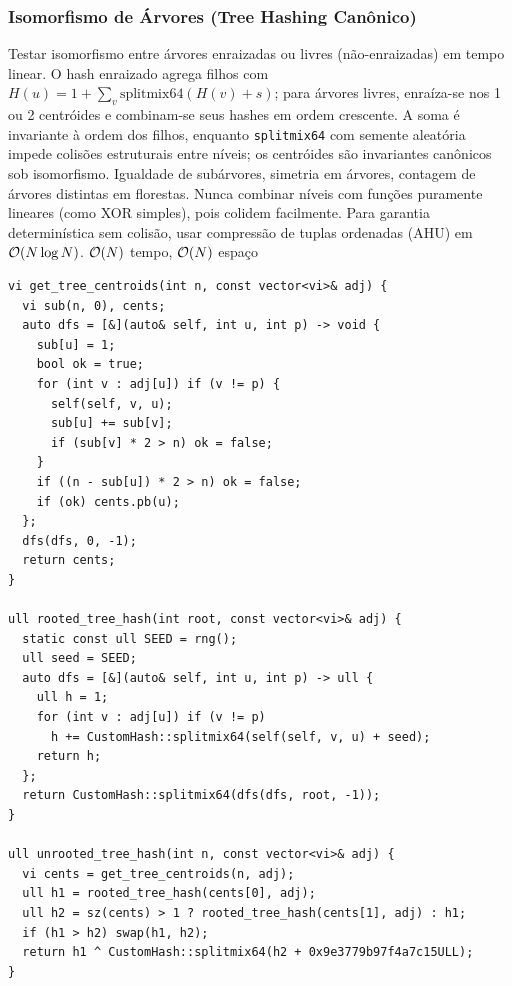 \subsubsection{Isomorfismo de Árvores (Tree Hashing Canônico)}
\algobox
  {Testar isomorfismo entre árvores enraizadas ou livres (não-enraizadas) em tempo linear.}
  {O hash enraizado agrega filhos com $H(u) = 1 + \sum_v \text{splitmix64}(H(v) + s)$; para árvores livres, enraíza-se nos 1 ou 2 centróides e combinam-se seus hashes em ordem crescente.}
  {A soma é invariante à ordem dos filhos, enquanto \texttt{splitmix64} com semente aleatória impede colisões estruturais entre níveis; os centróides são invariantes canônicos sob isomorfismo.}
  {Igualdade de subárvores, simetria em árvores, contagem de árvores distintas em florestas.}
  {Nunca combinar níveis com funções puramente lineares (como XOR simples), pois colidem facilmente. Para garantia determinística sem colisão, usar compressão de tuplas ordenadas (AHU) em $\mathcal{O}(N \log N)$.}
  {$\mathcal{O}(N)$ tempo, $\mathcal{O}(N)$ espaço}

\begin{lstlisting}
vi get_tree_centroids(int n, const vector<vi>& adj) {
  vi sub(n, 0), cents;
  auto dfs = [&](auto& self, int u, int p) -> void {
    sub[u] = 1;
    bool ok = true;
    for (int v : adj[u]) if (v != p) {
      self(self, v, u);
      sub[u] += sub[v];
      if (sub[v] * 2 > n) ok = false;
    }
    if ((n - sub[u]) * 2 > n) ok = false;
    if (ok) cents.pb(u);
  };
  dfs(dfs, 0, -1);
  return cents;
}

ull rooted_tree_hash(int root, const vector<vi>& adj) {
  static const ull SEED = rng();
  ull seed = SEED;
  auto dfs = [&](auto& self, int u, int p) -> ull {
    ull h = 1;
    for (int v : adj[u]) if (v != p)
      h += CustomHash::splitmix64(self(self, v, u) + seed);
    return h;
  };
  return CustomHash::splitmix64(dfs(dfs, root, -1));
}

ull unrooted_tree_hash(int n, const vector<vi>& adj) {
  vi cents = get_tree_centroids(n, adj);
  ull h1 = rooted_tree_hash(cents[0], adj);
  ull h2 = sz(cents) > 1 ? rooted_tree_hash(cents[1], adj) : h1;
  if (h1 > h2) swap(h1, h2);
  return h1 ^ CustomHash::splitmix64(h2 + 0x9e3779b97f4a7c15ULL);
}
\end{lstlisting}
